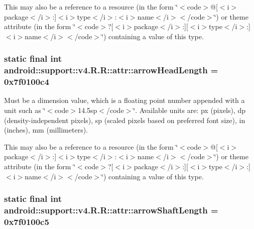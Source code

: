 This may also be a reference to a resource (in the form \char`\"{}$<$code$>$@\mbox{[}$<$i$>$package$<$/i$>$:\mbox{]}$<$i$>$type$<$/i$>$:$<$i$>$name$<$/i$>$$<$/code$>$\char`\"{}) or theme attribute (in the form \char`\"{}$<$code$>$?\mbox{[}$<$i$>$package$<$/i$>$:\mbox{]}\mbox{[}$<$i$>$type$<$/i$>$:\mbox{]}$<$i$>$name$<$/i$>$$<$/code$>$\char`\"{}) containing a value of this type. \hypertarget{classandroid_1_1support_1_1v4_1_1_r_1_1attr_d0136c27c4144aa3a561668b5757ec4a}{
\subsubsection[{arrowHeadLength}]{\setlength{\rightskip}{0pt plus 5cm}static final int android::support::v4.R.R::attr::arrowHeadLength = 0x7f0100c4}}
\label{classandroid_1_1support_1_1v4_1_1_r_1_1attr_d0136c27c4144aa3a561668b5757ec4a}


Must be a dimension value, which is a floating point number appended with a unit such as \char`\"{}$<$code$>$14.5sp$<$/code$>$\char`\"{}. Available units are: px (pixels), dp (density-independent pixels), sp (scaled pixels based on preferred font size), in (inches), mm (millimeters). 

This may also be a reference to a resource (in the form \char`\"{}$<$code$>$@\mbox{[}$<$i$>$package$<$/i$>$:\mbox{]}$<$i$>$type$<$/i$>$:$<$i$>$name$<$/i$>$$<$/code$>$\char`\"{}) or theme attribute (in the form \char`\"{}$<$code$>$?\mbox{[}$<$i$>$package$<$/i$>$:\mbox{]}\mbox{[}$<$i$>$type$<$/i$>$:\mbox{]}$<$i$>$name$<$/i$>$$<$/code$>$\char`\"{}) containing a value of this type. \hypertarget{classandroid_1_1support_1_1v4_1_1_r_1_1attr_df84cadc0198607eba25c6db99ed4d9e}{
\subsubsection[{arrowShaftLength}]{\setlength{\rightskip}{0pt plus 5cm}static final int android::support::v4.R.R::attr::arrowShaftLength = 0x7f0100c5}}
\label{classandroid_1_1support_1_1v4_1_1_r_1_1attr_df84cadc0198607eba25c6db99ed4d9e}


